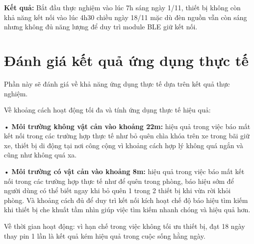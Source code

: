 \textbf{Kết quả: } Bắt đầu thực nghiệm vào lúc 7h sáng ngày 1/11, thiết bị không còn khả năng kết nối vào lúc 4h30 chiều ngày 18/11 mặc dù đèn nguồn vẫn còn sáng nhưng không đủ năng lượng để duy trì module BLE giữ kết nối.

\section{Đánh giá kết quả ứng dụng thực tế}
\label{result}
Phần này sẽ đánh giá về khả năng ứng dụng thực tế dựa trên kết quả thực nghiệm.

Về khoảng cách hoạt động tối đa và tính ứng dụng thực tế hiệu quả:

• \textbf{Môi trường không vật cản vào khoảng 22m: }hiệu quả trong việc báo mất kết nối trong các trường hợp thực tế như bỏ quên chìa khóa trên xe trong bãi giữ xe, thiết bị di động tại nơi công cộng vì khoảng cách hợp lý không quá ngắn và cũng như không quá xa.

• \textbf{Môi trường có vật cản vào khoảng 8m:} hiệu quả trong việc báo mất kết nối trong các trường hợp thực tế như để quên trong phòng, báo hiệu sớm để người dùng có thể biết ngay khi bỏ quên 1 trong 2 thiết bị khi vừa rời khỏi phòng. Và khoảng cách đủ để duy trì kết nối kích hoạt chế độ báo hiệu tìm kiếm khi thiết bị che khuất tầm nhìn giúp việc tìm kiếm nhanh chóng và hiệu quả hơn.

Về thời gian hoạt động: vì hạn chế trong việc không tối ưu thiết bị, đạt 18 ngày thay pin 1 lần là kết quả kém hiệu quả trong cuộc sống hằng ngày.